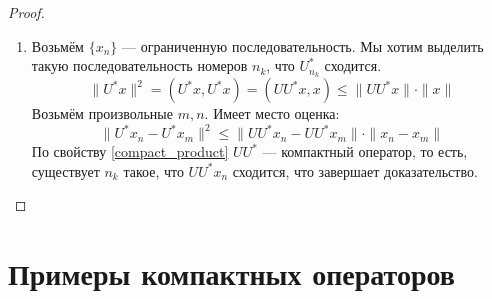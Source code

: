 \documentclass[11pt,openany,a4paper]{scrartcl}
\theoremstyle{plain}
\theoremstyle{definition}
\begin{document}
\begin{proof}
\begin{enumerate}
        \item Возьмём $\{x_n\}$ — ограниченную последовательность. Мы хотим выделить такую
        последовательность номеров $n_k$, что $U_{n_k}^\ast$ сходится.
        $$
        \|U^\ast x\|^2 = (U^\ast x, U^\ast x) =
        (UU^\ast x, x) \leqslant \|UU^\ast x\|\cdot \|x\|        
        $$
        Возьмём произвольные $m, n$. Имеет место оценка:
        $$
        \|U^\ast x_n - U^\ast x_m\|^2 \leqslant
        \|UU^\ast x_n - UU^\ast x_m\| \cdot \|x_n - x_m\|
        $$
        По свойству \ref{compact_product} $UU^\ast$ — компактный оператор, то есть,
        существует $n_k$ такое, что $UU^\ast x_n$ сходится, что завершает доказательство.
    \end{enumerate}
\end{proof}

\section{Примеры компактных операторов}
\end{document}
